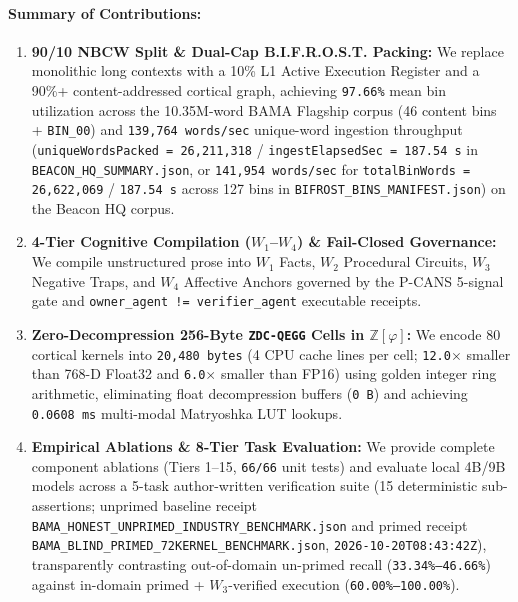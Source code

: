 \documentclass[10pt,twocolumn,letterpaper]{article}
\begin{document}
\paragraph{Summary of Contributions:}
\begin{enumerate}
    \item \textbf{90/10 NBCW Split \& Dual-Cap B.I.F.R.O.S.T. Packing:} We replace monolithic long contexts with a 10\% L1 Active Execution Register and a 90\%+ content-addressed cortical graph, achieving \texttt{97.66\%} mean bin utilization across the 10.35M-word BAMA Flagship corpus (46 content bins + \texttt{BIN\_00}) and \texttt{139,764 words/sec} unique-word ingestion throughput (\texttt{uniqueWordsPacked = 26,211,318} / \texttt{ingestElapsedSec = 187.54\,s} in \texttt{BEACON\_HQ\_SUMMARY.json}, or \texttt{141,954 words/sec} for \texttt{totalBinWords = 26,622,069} / \texttt{187.54\,s} across 127 bins in \texttt{BIFROST\_BINS\_MANIFEST.json}) on the Beacon HQ corpus.
    \item \textbf{4-Tier Cognitive Compilation ($W_1$--$W_4$) \& Fail-Closed Governance:} We compile unstructured prose into $W_1$ Facts, $W_2$ Procedural Circuits, $W_3$ Negative Traps, and $W_4$ Affective Anchors governed by the P-CANS 5-signal gate and \texttt{owner\_agent != verifier\_agent} executable receipts.
    \item \textbf{Zero-Decompression 256-Byte \texttt{ZDC-QEGG} Cells in $\mathbb{Z}[\varphi]$:} We encode 80 cortical kernels into \texttt{20,480 bytes} (4 CPU cache lines per cell; \texttt{12.0$\times$} smaller than 768-D Float32 and \texttt{6.0$\times$} smaller than FP16) using golden integer ring arithmetic, eliminating float decompression buffers (\texttt{0\,B}) and achieving \texttt{0.0608\,ms} multi-modal Matryoshka LUT lookups.
    \item \textbf{Empirical Ablations \& 8-Tier Task Evaluation:} We provide complete component ablations (Tiers 1--15, \texttt{66/66} unit tests) and evaluate local 4B/9B models across a 5-task author-written verification suite (15 deterministic sub-assertions; unprimed baseline receipt \texttt{BAMA\_HONEST\_UNPRIMED\_INDUSTRY\_BENCHMARK.json} and primed receipt \texttt{BAMA\_BLIND\_PRIMED\_72KERNEL\_BENCHMARK.json}, \texttt{2026-10-20T08:43:42Z}), transparently contrasting out-of-domain un-primed recall (\texttt{33.34\%--46.66\%}) against in-domain primed + $W_3$-verified execution (\texttt{60.00\%--100.00\%}).
\end{enumerate}
\end{document}
